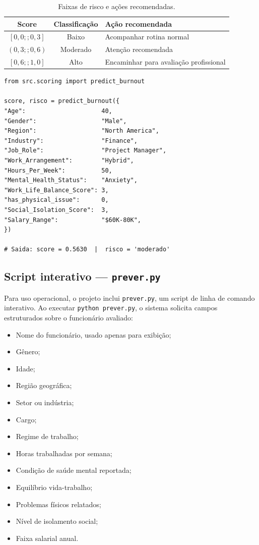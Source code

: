 \documentclass[conference]{IEEEtran}
\newcommand{\fonte}[1][elaborado pelos autores.]{%
\par\vspace{1pt}{\footnotesize\centering Fonte: #1\par}}
\begin{document}
\begin{table}[!t]
\centering
\caption{Faixas de risco e ações recomendadas.}
\label{tab:risk}
\begin{tabular}{ccl}
\toprule
\textbf{Score}    & \textbf{Classificação} & \textbf{Ação recomendada} \\
\midrule
$[0{,}0;;0{,}3]$ & Baixo                  & Acompanhar rotina normal  \\
$(0{,}3;;0{,}6)$ & Moderado               & Atenção recomendada       \\
$[0{,}6;;1{,}0]$ & Alto                   & Encaminhar para avaliação profissional \\
\bottomrule
\end{tabular}
\fonte
\end{table}

\begin{lstlisting}[caption={Uso programático de \texttt{predict_burnout}
via \texttt{src/scoring.py}.}]
from src.scoring import predict_burnout

score, risco = predict_burnout({
"Age":                     40,
"Gender":                  "Male",
"Region":                  "North America",
"Industry":                "Finance",
"Job_Role":                "Project Manager",
"Work_Arrangement":        "Hybrid",
"Hours_Per_Week":          50,
"Mental_Health_Status":    "Anxiety",
"Work_Life_Balance_Score": 3,
"has_physical_issue":      0,
"Social_Isolation_Score":  3,
"Salary_Range":            "$60K-80K",
})

# Saida: score = 0.5630  |  risco = 'moderado'

\end{lstlisting}

\subsection{Script interativo — \texttt{prever.py}}

Para uso operacional, o projeto inclui \texttt{prever.py}, um script de
linha de comando interativo. Ao executar \texttt{python prever.py}, o
sistema solicita campos estruturados sobre o funcionário avaliado:

\begin{itemize}
\item Nome do funcionário, usado apenas para exibição;
\item Gênero;
\item Idade;
\item Região geográfica;
\item Setor ou indústria;
\item Cargo;
\item Regime de trabalho;
\item Horas trabalhadas por semana;
\item Condição de saúde mental reportada;
\item Equilíbrio vida-trabalho;
\item Problemas físicos relatados;
\item Nível de isolamento social;
\item Faixa salarial anual.
\end{itemize}
\end{document}
